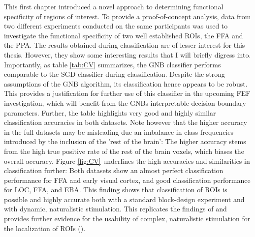 \documentclass[a4paper, 12pt]{scrreprt}
\begin{document}
This first chapter introduced a novel approach to determining functional specificity of regions of interest. To provide a proof-of-concept analysis, data from two different experiments conducted on the same participants was used to investigate the functional specificity of two well established ROIs, the FFA and the PPA. \newline
The results obtained during classification are of lesser interest for this thesis. However, they show some interesting results that I will briefly digress into. Importantly, as table \ref{tab:CV} summarizes, the GNB classifier performs comparable to the SGD classifier during classification. Despite the strong assumptions of the GNB algorithm, its classification hence appears to be robust. This provides a justification for further use of this classifier in the upcoming FEF investigation, which will benefit from the GNBs interpretable decision boundary parameters. Further, the table highlights very good and highly similar classification accuracies in both datasets. Note however that the higher accuracy in the full datasets may be misleading due an imbalance in class frequencies introduced by the inclusion of the 'rest of the brain': The higher accuracy stems from the high true positive rate of the rest of the brain voxels, which biases the overall accuracy. \newline 
Figure \ref{fig:CV} underlines the high accuracies and similarities in classification further: Both datasets show an almost perfect classification performance for FFA and early visual cortex, and good classification performance for LOC, FFA, and EBA. This finding shows that classification of ROIs is possible and highly accurate both with a standard block-design experiment and with dynamic, naturalistic stimulation. This replicates the findings of \textcite{nastase2016} and provides further evidence for the usability of complex, naturalistic stimulation for the localization of ROIs (\cite{malinen2007towards}).\\
\end{document}
